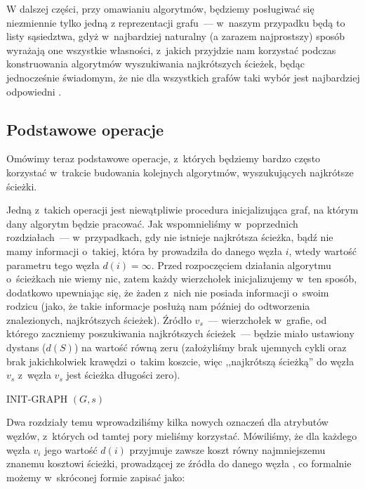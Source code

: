 W dalszej części, przy omawianiu algorytmów, będziemy posługiwać się niezmiennie tylko jedną z reprezentacji grafu~---  w~naszym przypadku będą to listy sąsiedztwa, gdyż w~najbardziej naturalny (a zarazem najprostszy) sposób wyrażają one wszystkie własności, z~jakich przyjdzie nam korzystać podczas konstruowania algorytmów wyszukiwania najkrótszych ścieżek, będąc jednocześnie świadomym, że nie dla wszystkich grafów taki wybór jest najbardziej odpowiedni \cite[$1$]{eCOMPASS_TR_005}.

\subsection{Podstawowe operacje}

Omówimy teraz podstawowe operacje, z~których będziemy bardzo często korzystać w~trakcie budowania kolejnych algorytmów, wyszukujących najkrótsze ścieżki.

Jedną z~takich operacji jest niewątpliwie procedura inicjalizująca graf, na którym dany algorytm będzie pracować. Jak wspomnieliśmy w~poprzednich rozdziałach~--- w~przypadkach, gdy nie istnieje najkrótsza ścieżka, bądź nie mamy informacji o~takiej, która by prowadziła do danego węzła $i$, wtedy wartość parametru tego węzła $d \left( i \right) = \infty$. Przed rozpoczęciem działania algorytmu o~ścieżkach nie wiemy nic, zatem każdy wierzchołek inicjalizujemy w~ten sposób, dodatkowo upewniając się, że żaden z~nich nie posiada informacji o~swoim rodzicu (jako, że takie informacje posłużą nam później do odtworzenia znalezionych, najkrótszych ścieżek). Źródło $v_{s}$~---  wierzchołek w~grafie, od którego zaczniemy poszukiwania najkrótszych ścieżek~---  będzie miało ustawiony dystans ($d \left( S \right)$) na wartość równą zeru (założyliśmy brak ujemnych cykli oraz brak jakichkolwiek krawędzi o~takim koszcie, więc ,,najkrótszą ścieżką'' do węzła $v_{s}$ z~węzła $v_{s}$ jest ścieżka długości zero).

\begin{pseudokod}[!htbp]
\DontPrintSemicolon
{}
\caption{INIT-GRAPH $\left( G, s \right)$\label{alg:init-graph}}
\end{pseudokod}

Dwa rozdziały temu wprowadziliśmy kilka nowych oznaczeń dla atrybutów węzłów, z~których od tamtej pory mieliśmy korzystać. Mówiliśmy, że dla każdego węzła $v_{i}$ jego wartość $d \left( i \right) $ przyjmuje zawsze koszt równy najmniejszemu znanemu kosztowi ścieżki, prowadzącej ze źródła do danego węzła , co formalnie możemy w~skróconej formie zapisać jako:

